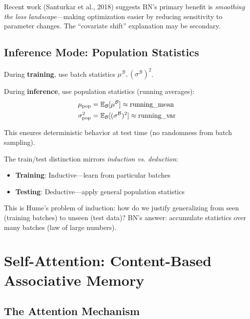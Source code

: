 \begin{remark}
	Recent work (Santurkar et al., 2018) suggests BN's primary benefit is \textit{smoothing the loss landscape}---making optimization easier by reducing sensitivity to parameter changes. The ``covariate shift'' explanation may be secondary.
\end{remark}

\subsection{Inference Mode: Population Statistics}

\begin{notation}
	During \textbf{training}, use batch statistics $\mu^{\mathcal{B}}, (\sigma^{\mathcal{B}})^2$.
	
	During \textbf{inference}, use population statistics (running averages):
	\begin{align}
		\mu_{\text{pop}} &= \mathbb{E}_{\mathcal{B}}[\mu^{\mathcal{B}}] \approx \text{running\_mean} \\
		\sigma^2_{\text{pop}} &= \mathbb{E}_{\mathcal{B}}[(\sigma^{\mathcal{B}})^2] \approx \text{running\_var}
	\end{align}
	
	This ensures deterministic behavior at test time (no randomness from batch sampling).
\end{notation}

\begin{philosophical}
	The train/test distinction mirrors \textit{induction vs. deduction}:
	\begin{itemize}
		\item \textbf{Training}: Inductive---learn from particular batches
		\item \textbf{Testing}: Deductive---apply general population statistics
	\end{itemize}
	
	This is Hume's problem of induction: how do we justify generalizing from seen (training batches) to unseen (test data)? BN's answer: accumulate statistics over many batches (law of large numbers).
\end{philosophical}

\section{Self-Attention: Content-Based Associative Memory}

\subsection{The Attention Mechanism}

